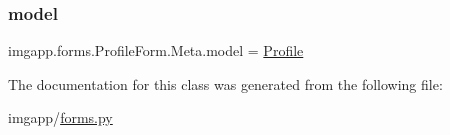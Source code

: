 \mbox{\label{classimgapp_1_1forms_1_1ProfileForm_1_1Meta_a1781be7cea589fabd63eec0d18cdd232}} 
\subsubsection{\texorpdfstring{model}{model}}
{\footnotesize\ttfamily imgapp.\+forms.\+Profile\+Form.\+Meta.\+model = \hyperlink{classimgapp_1_1models_1_1Profile}{Profile}\hspace{0.3cm}{\ttfamily [static]}}



The documentation for this class was generated from the following file\+:\begin{DoxyCompactItemize}
\item 
imgapp/\hyperlink{forms_8py}{forms.\+py}\end{DoxyCompactItemize}
